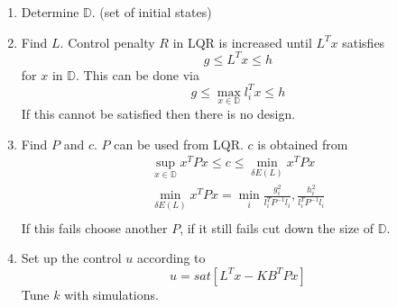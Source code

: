 \begin{enumerate} 
    \item Determine $\mathbb{D}$. (set of initial states)
    \item Find $L$. Control penalty $R$ in LQR is increased until $L^Tx$ satisfies
    \begin{equation}
        g\leq L^Tx\leq h
    \end{equation}
    for $x$ in $\mathbb{D}$. This can be done via
    \begin{equation}
        g\leq\max_{x\in\mathbb{D}}l_i^Tx\leq h
    \end{equation}
    If this cannot be satisfied then there is no design.
    \item Find $P$ and $c$. $P$ can be used from LQR. $c$ is obtained from
    \begin{equation}
    \begin{split}
        \sup_{x\in\mathbb{D}}x^TPx\leq c\leq \min_{\delta E(L)}x^TPx\\
        \min_{\delta E(L)}x^TPx=\min_i{\frac{g_i^2}{l_i^TP^{-1}l_i},\frac{h_i^2}{l_i^TP^{-1}l_i}}\\
    \end{split}
    \end{equation}
    If this fails choose another $P$, if it still fails cut down the size of $\mathbb{D}$.
    \item Set up the control $u$ according to 
    \begin{equation}
        u=sat[L^Tx-KB^TPx]
    \end{equation}
    Tune $k$ with simulations.
\end{enumerate}

